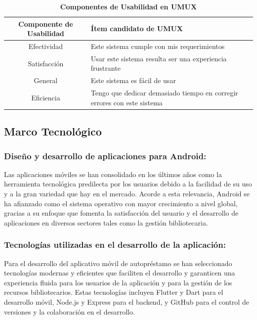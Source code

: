 \documentclass[spanish]{ieee_upb}
\begin{document}
\begin{table}[htpb]
    \centering
    \caption[Nombre en la lista de tablas]{\bfseries Componentes de Usabilidad en UMUX }
    \label{tabla:UMUX}
   
    \begin{tabular}{|c|p{11cm}|} \hline 
         \textbf{Componente de Usabilidad}&  \textbf{Ítem candidato de UMUX}\\ \hline 
         Efectividad  & Este sistema cumple con mis requerimientos \\ \hline 
         Satisfacción &Usar este sistema resulta ser una experiencia frustrante \\ \hline 
         General      & Este sistema es fácil de usar \\ \hline
         Eficiencia   & Tengo que dedicar demasiado tiempo en corregir errores con este sistema \\ \hline
    \end{tabular}    
\end{table}



\subsection{Marco Tecnológico}
\subsubsection{Diseño y desarrollo de aplicaciones para Android: }
Las aplicaciones móviles se han consolidado en los últimos años como la herramienta tecnológica predilecta por los usuarios debido a la facilidad de su uso y a la gran variedad que hay en el mercado. Acorde a esta relevancia, Android se ha afianzado como el sistema operativo con mayor crecimiento a nivel global, gracias a su enfoque que fomenta la satisfacción del usuario y el desarrollo de aplicaciones en diversos sectores tales como la gestión bibliotecaria. \cite{Statista2025} \cite{polanco2011android}

\subsubsection{Tecnologías utilizadas en el desarrollo de la aplicación: }
Para el desarrollo del aplicativo móvil de autopréstamo se han seleccionado tecnologías modernas y eficientes que faciliten el desarrollo y garanticen una experiencia fluida para los usuarios de la aplicación y para la gestión de los recursos bibliotecarios. Estas tecnologías incluyen Flutter y Dart para el desarrollo móvil, Node.js y Express para el backend, y GitHub para el control de versiones y la colaboración en el desarrollo.
\vspace{0.3 cm}
\end{document}

